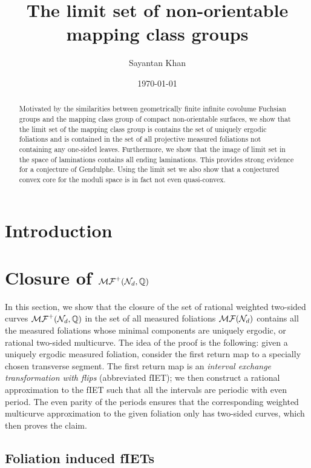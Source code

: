 \documentclass[12pt, reqno]{amsart}
\title{The limit set of non-orientable mapping class groups}
\author{Sayantan Khan}
\date{\today}
\begin{document}
\maketitle
\begin{abstract}
  Motivated by the similarities between geometrically finite infinite covolume Fuchsian groups and the mapping class group of compact non-orientable surfaces, we show that the limit set of the mapping class group is contains the set of uniquely ergodic foliations and is contained in the set of all projective measured foliations not containing any one-sided leaves.
  Furthermore, we show that the image of limit set in the space of laminations contains all ending laminations.
  This provides strong evidence for a conjecture of Gendulphe.
  Using the limit set we also show that a conjectured convex core for the moduli space is in fact not even quasi-convex.
\end{abstract}
\tableofcontents

\section{Introduction}
\label{sec:introduction}

\section{Closure of $\mathcal{MF}^+(\mathcal{N}_d, \mathbb{Q})$}
\label{sec:closure-mf}

In this section, we show that the closure of the set of rational weighted two-sided curves $\mathcal{MF}^+(\mathcal{N}_d, \mathbb{Q})$ in the set of all measured foliations $\mathcal{MF}(\mathcal{N}_d)$ contains all the measured foliations whose minimal components are uniquely ergodic, or rational two-sided multicurve.
The idea of the proof is the following: given a uniquely ergodic measured foliation, consider the first return map to a specially chosen transverse segment.
The first return map is an \emph{interval exchange transformation with flips} (abbreviated fIET); we then construct a rational approximation to the fIET such that all the intervals are periodic with even period.
The even parity of the periods ensures that the corresponding weighted multicurve approximation to the given foliation only has two-sided curves, which then proves the claim.

\subsection*{Foliation induced fIETs}
\end{document}
